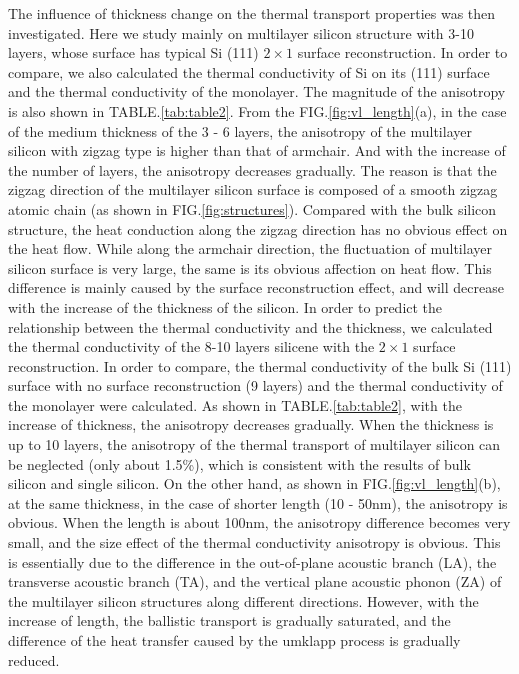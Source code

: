 \documentclass[%
 reprint,
 amsmath,amssymb,
 aps,
 prb,
]{revtex4-1}
\begin{document}
The influence of thickness change on the thermal transport properties was then investigated. Here we study mainly on multilayer silicon structure with 3-10 layers, whose  surface has typical Si (111) $2 \times 1$ surface reconstruction. In order to compare, we also calculated the thermal conductivity of Si on its (111) surface and the thermal conductivity of the monolayer. The magnitude of the anisotropy is also shown in TABLE.\ref{tab:table2}. From the FIG.\ref{fig:vl_length}(a), in the case of the medium thickness of the 3 - 6 layers, the anisotropy of the multilayer silicon with zigzag type is higher than that of armchair. And with the increase of the number of layers, the anisotropy decreases gradually. The reason is that the zigzag direction of the multilayer silicon surface is composed of a smooth zigzag atomic chain (as shown in FIG.\ref{fig:structures}). Compared with the bulk silicon structure, the heat conduction along the zigzag direction has no obvious effect on the heat flow. While along the armchair direction, the fluctuation of multilayer silicon surface is very large, the same is its obvious affection on heat flow. This difference is mainly caused by the surface reconstruction effect, and will decrease with the increase of the thickness of the silicon. In order to predict the relationship between the thermal conductivity and the thickness, we calculated the thermal conductivity of the 8-10 layers silicene with the $2 \times 1$ surface reconstruction. In order to compare, the thermal conductivity of the bulk Si (111) surface with no surface reconstruction (9 layers) and the thermal conductivity of the monolayer were calculated. As shown in TABLE.\ref{tab:table2}, with the increase of thickness, the anisotropy decreases gradually. When the thickness is up to 10 layers, the anisotropy of the thermal transport of multilayer silicon can be neglected (only about 1.5\%), which is consistent with the results of bulk silicon and single silicon. On the other hand, as shown in FIG.\ref{fig:vl_length}(b), at the same thickness, in the case of shorter length (10 - 50nm), the anisotropy is obvious. When the length is about 100nm, the anisotropy difference becomes very small, and the size effect of the thermal conductivity anisotropy is obvious. This is essentially due to the difference in the out-of-plane acoustic branch (LA), the transverse acoustic branch (TA), and the vertical plane acoustic phonon (ZA) of the multilayer silicon structures along different directions. However, with the increase of length, the ballistic transport is gradually saturated, and the difference of the heat transfer caused by the umklapp process is gradually reduced.
\end{document}
